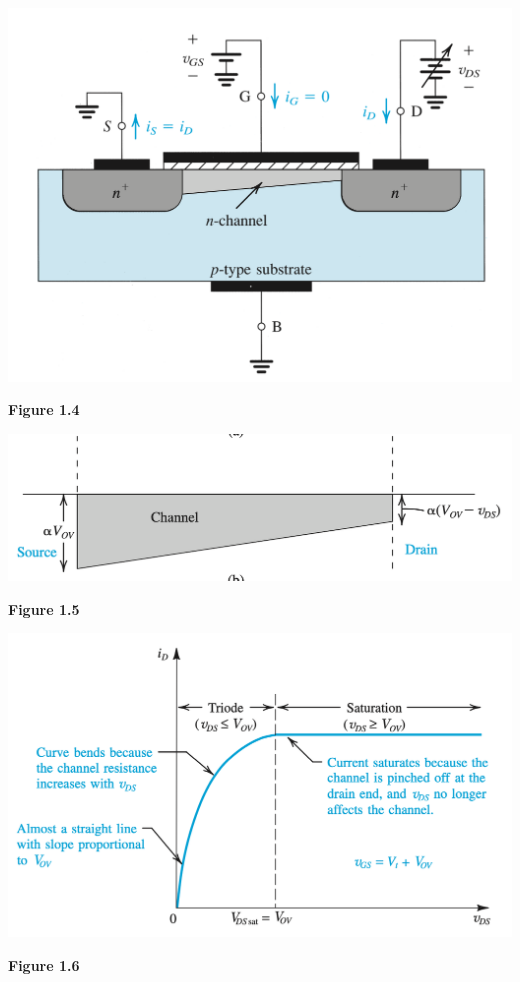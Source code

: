 \documentclass[12pt]{article}
\begin{document}
    \begin{center}
        \centerline{\includegraphics[scale=0.48]{figures/mosfet_induced2.png}}
        \textbf{Figure 1.4}
    \end{center}
    \begin{center}
        \centerline{\includegraphics[scale=0.5]{figures/fig5.png}}
        \textbf{Figure 1.5}
    \end{center}
    \begin{center}
        \centerline{\includegraphics[scale=0.5]{figures/fig6.png}}
        \textbf{Figure 1.6}
    \end{center}
\end{document}
